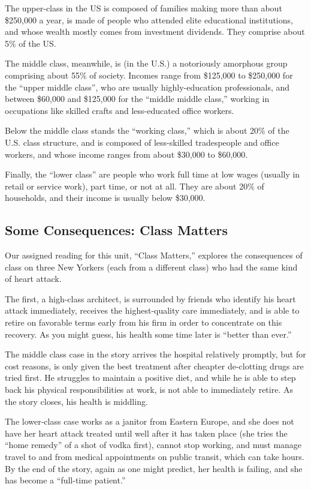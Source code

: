 \documentclass[
  letterpaper,
  DIV=11,
  numbers=noendperiod,
  oneside]{scrartcl}
\begin{document}
The upper-class in the US is composed of families making more than about
\$250,000 a year, is made of people who attended elite educational
institutions, and whose wealth mostly comes from investment dividends.
They comprise about 5\% of the US.

The middle class, meanwhile, is (in the U.S.) a notoriously amorphous
group comprising about 55\% of society. Incomes range from \$125,000 to
\$250,000 for the ``upper middle class'', who are usually
highly-education professionals, and between \$60,000 and \$125,000 for
the ``middle middle class,'' working in occupations like skilled crafts
and less-educated office workers.

Below the middle class stands the ``working class,'' which is about 20\%
of the U.S. class structure, and is composed of less-skilled
tradespeople and office workers, and whose income ranges from about
\$30,000 to \$60,000.

Finally, the ``lower class'' are people who work full time at low wages
(usually in retail or service work), part time, or not at all. They are
about 20\% of households, and their income is usually below \$30,000.

\subsection{Some Consequences: Class
Matters}\label{some-consequences-class-matters}

Our assigned reading for this unit, ``Class Matters,'' explores the
consequences of class on three New Yorkers (each from a different class)
who had the same kind of heart attack.

The first, a high-class architect, is surrounded by friends who identify
his heart attack immediately, receives the highest-quality care
immediately, and is able to retire on favorable terms early from his
firm in order to concentrate on this recovery. As you might guess, his
health some time later is ``better than ever.''

The middle class case in the story arrives the hospital relatively
promptly, but for cost reasons, is only given the best treatment after
cheapter de-clotting drugs are tried first. He struggles to maintain a
positive diet, and while he is able to step back his physical
responsibilities at work, is not able to immediately retire. As the
story closes, his health is middling.

The lower-class case works as a janitor from Eastern Europe, and she
does not have her heart attack treated until well after it has taken
place (she tries the ``home remedy'' of a shot of vodka first), cannot
stop working, and must manage travel to and from medical appointments on
public transit, which can take hours. By the end of the story, again as
one might predict, her health is failing, and she has become a
``full-time patient.''
\end{document}

